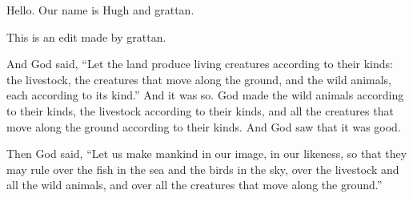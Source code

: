 \documentclass{grattanAlpha}
\begin{document}
Hello. Our name is Hugh and grattan.


This is an edit made by grattan.


And God said, “Let the land produce living creatures according to their kinds: the livestock, the creatures that move along the ground, and the wild animals, each according to its kind.” And it was so. God made the wild animals according to their kinds, the livestock according to their kinds, and all the creatures that move along the ground according to their kinds. And God saw that it was good.

Then God said, “Let us make mankind in our image, in our likeness, so that they may rule over the fish in the sea and the birds in the sky, over the livestock and all the wild animals, and over all the creatures that move along the ground.”
\end{document}

